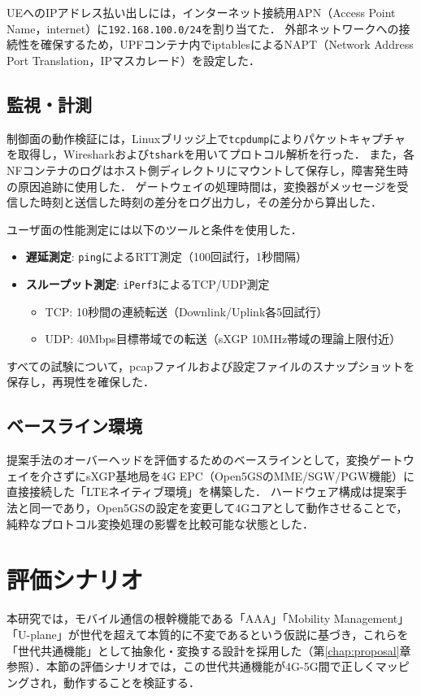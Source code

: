 UEへのIPアドレス払い出しには，インターネット接続用APN（Access Point Name，internet）に\texttt{192.168.100.0/}\allowbreak\texttt{24}を割り当てた．
外部ネットワークへの接続性を確保するため，UPFコンテナ内でiptablesによるNAPT（Network Address Port Translation，IPマスカレード）を設定した．

\subsection{監視・計測}
制御面の動作検証には，Linuxブリッジ上で\texttt{tcpdump}によりパケットキャプチャを取得し，Wiresharkおよび\texttt{tshark}を用いてプロトコル解析を行った．
また，各NFコンテナのログはホスト側ディレクトリにマウントして保存し，障害発生時の原因追跡に使用した．
ゲートウェイの処理時間は，変換器がメッセージを受信した時刻と送信した時刻の差分をログ出力し，その差分から算出した．

ユーザ面の性能測定には以下のツールと条件を使用した．
\begin{itemize}
    \item \textbf{遅延測定}: \texttt{ping}によるRTT測定（100回試行，1秒間隔）
    \item \textbf{スループット測定}: \texttt{iPerf3}によるTCP/UDP測定
    \begin{itemize}
        \item TCP: 10秒間の連続転送（Downlink/Uplink各5回試行）
        \item UDP: 40Mbps目標帯域での転送（sXGP 10MHz帯域の理論上限付近）
    \end{itemize}
\end{itemize}
すべての試験について，pcapファイルおよび設定ファイルのスナップショットを保存し，再現性を確保した．

\subsection{ベースライン環境}
提案手法のオーバーヘッドを評価するためのベースラインとして，変換ゲートウェイを介さずにsXGP基地局を4G EPC（Open5GSのMME/SGW/PGW機能）に直接接続した「LTEネイティブ環境」を構築した．
ハードウェア構成は提案手法と同一であり，Open5GSの設定を変更して4Gコアとして動作させることで，純粋なプロトコル変換処理の影響を比較可能な状態とした．

\section{評価シナリオ}

本研究では，モバイル通信の根幹機能である「AAA」「Mobility Management」「U-plane」が世代を超えて本質的に不変であるという仮説に基づき，これらを「世代共通機能」として抽象化・変換する設計を採用した（第\ref{chap:proposal}章参照）．本節の評価シナリオでは，この世代共通機能が4G-5G間で正しくマッピングされ，動作することを検証する．

